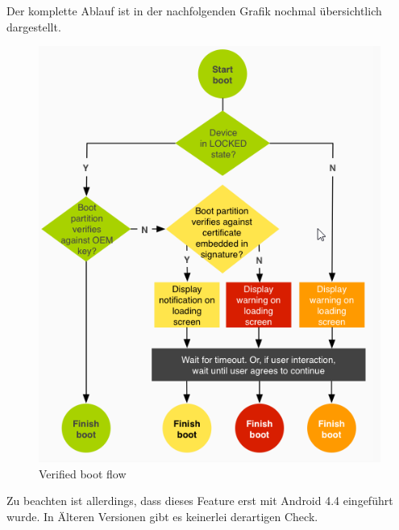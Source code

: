 	Der komplette Ablauf ist in der nachfolgenden Grafik nochmal übersichtlich dargestellt.
	\begin{figure}[h]
		\centering
		\includegraphics[width=0.6\linewidth, height=0.4\textheight]{android_pages/graphics/VerifiedBoot}
		\caption[Verified boot flow\protect\cite{VerifyingBoot}]{Verified boot flow\protect\cite{VerifyingBoot}}
		\label{fig:VerifiedBoot}
	\end{figure}

\begin{flushleft}
	Zu beachten ist allerdings, dass dieses Feature erst mit Android 4.4 eingeführt wurde. In Älteren Versionen gibt es keinerlei derartigen Check.
\end{flushleft}



